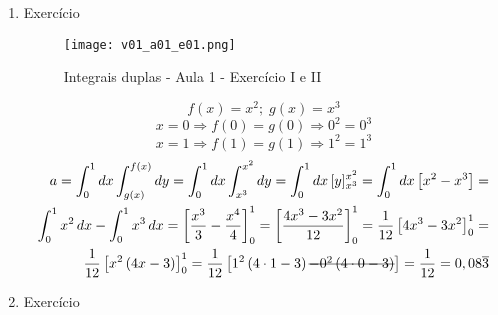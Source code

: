 \begin{enumerate}
	\item Exercício
	
	\begin{figure}[htb]
		\caption{Integrais duplas - Aula 1 - Exercício I e II}
		\label{v01_a01_e01}
		\centering
		\texttt{[image: v01\_a01\_e01.png]}		
	\end{figure}
	
	\begin{equation*}
		f(x) = x^2;\; g(x) = x^3
	\end{equation*}			
	\begin{equation*}
		x = 0 \Rightarrow f(0) = g(0) \Rightarrow 0^2 = 0^3
	\end{equation*}
	\begin{equation*}
		x = 1 \Rightarrow f(1) = g(1) \Rightarrow 1^2 = 1^3
	\end{equation*}
	\begin{align*}
		a = \int_0^1 dx \int_{g(x)}^{f(x)} dy = \int_0^1 dx \int_{x^3}^{x^2} dy = \int_0^1 dx\, [y]_{x^3}^{x^2} = \int_0^1 dx \left[x^2 - x^3\right] =\\ \int_0^1 x^2\, dx - \int_0^1 x^3\, dx = \left[\dfrac{x^3}{3} - \dfrac{x^4}{4}\right]_0^1 = \left[\dfrac{4x^3 - 3x^2}{12}\right]_0^1 = \dfrac{1}{12}\left[4x^3 - 3x^2\right]_0^1 =\\ \dfrac{1}{12}\left[x^2\left(4x - 3\right)\right]_0^1 = \dfrac{1}{12}\left[1^2\left(4 \cdot 1 - 3\right) \overstrike{- 0^2\left(4 \cdot 0 - 3\right)}\right] = \dfrac{1}{12} = 0,08\overline{3}			
	\end{align*}
						
	\item Exercício
	

\end{enumerate}
